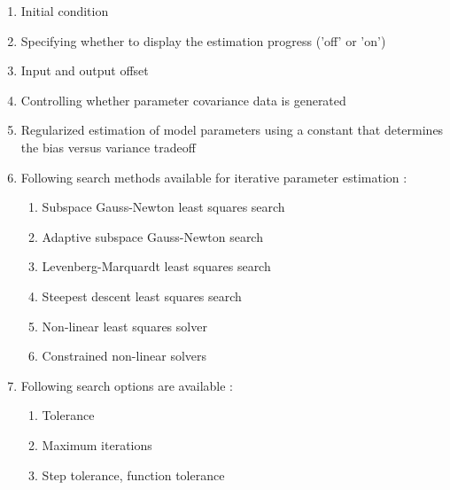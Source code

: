 \documentclass[a4paper,12pt]{report}
\begin{document}
\begin{enumerate}
\begin{enumerate}
			\begin{enumerate}
				\item Initial condition
				\item Specifying whether to display the estimation progress ('off' or 'on') 
				\item Input and output offset
				\item Controlling whether parameter covariance data is generated 
				\item Regularized estimation of model parameters using a constant that determines the bias versus variance tradeoff 
				\item Following search methods available for iterative parameter estimation :
				\begin{enumerate}
					\item Subspace Gauss-Newton least squares search
					\item Adaptive subspace Gauss-Newton search
					\item Levenberg-Marquardt least squares search
					\item Steepest descent least squares search
					\item Non-linear least squares solver
					\item Constrained non-linear solvers
				\end{enumerate}
				
				\item Following search options are available :
				\begin{enumerate}
					\item Tolerance
					\item Maximum iterations
					\item Step tolerance, function tolerance
				\end{enumerate}
				

\end{enumerate}
\end{enumerate}
\end{enumerate}
\end{document}
